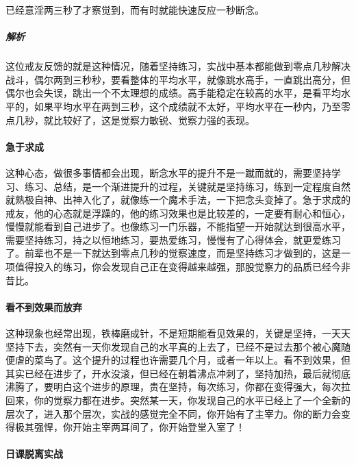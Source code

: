\begin{case}
    已经意淫两三秒了才察觉到，而有时就能快速反应一秒断念。
    \subparagraph{解析} 这位戒友反馈的就是这种情况，随着坚持练习，实战中基本都能做到零点几秒解决战斗，偶尔两到三秒秒，要看整体的平均水平，就像跳水高手，一直跳出高分，但偶尔也会失误，跳出一个不太理想的成绩。高手能稳定在较高的水平，是看平均水平的，如果平均水平在两到三秒，这个成绩就不太好，平均水平在一秒内，乃至零点几秒，就比较好了，这是觉察力敏锐、觉察力强的表现。
\end{case}

\paragraph{急于求成}

这种心态，做很多事情都会出现，断念水平的提升不是一蹴而就的，需要坚持学习、练习、总结，是一个渐进提升的过程，关键就是坚持练习，练到一定程度自然就熟极自神、出神入化了，就像练一个魔术手法，一下把念头变掉了。急于求成的戒友，他的心态就是浮躁的，他的练习效果也是比较差的，一定要有耐心和恒心，慢慢就能看到自己进步了。也像练习一门乐器，不能指望一开始就达到很高水平，需要坚持练习，持之以恒地练习，要热爱练习，慢慢有了心得体会，就更爱练习了。前辈也不是一下就达到零点几秒的觉察速度，而是坚持练习才做到的，这是一项值得投入的练习，你会发现自己正在变得越来越强，那股觉察力的品质已经今非昔比。

\paragraph{看不到效果而放弃}

这种现象也经常出现，铁棒磨成针，不是短期能看见效果的，关键是坚持，一天天坚持下去，突然有一天你发现自己的水平真的上去了，已经不是过去那个被心魔随便虐的菜鸟了。这个提升的过程也许需要几个月，或者一年以上。看不到效果，但其实已经在进步了，开水没滚，但已经在朝着沸点冲刺了，坚持加热，最后就彻底沸腾了，要明白这个进步的原理，贵在坚持，每次练习，你都在变得强大，每次拉回来，你的觉察力都在进步。突然某一天，你发现自己的水平已经上了一个全新的层次了，进入那个层次，实战的感觉完全不同，你开始有了主宰力。你的断力会变得极其强悍，你开始主宰两耳间了，你开始登堂入室了！

\paragraph{日课脱离实战}


